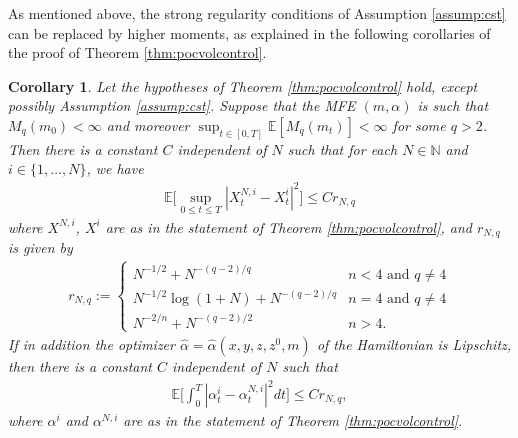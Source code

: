 \documentclass[11pt,reqno]{amsart}
\numberwithin{equation}{section}
\newtheorem{corollary}[theorem]{Corollary}
\theoremstyle{definition}
\def\E{{\mathbb E}}
\def\N{{\mathbb N}}
\def \E{\mathbb{E}}
\def \N{\mathbb{N}}
\begin{document}
As mentioned above, the strong regularity conditions of Assumption \ref{assump:cst} can be replaced by higher moments, as explained in the following corollaries of the proof of Theorem \ref{thm:pocvolcontrol}. 

\begin{corollary}
\label{cor:q.moment}
 Let the hypotheses of Theorem \ref{thm:pocvolcontrol} hold, except possibly Assumption \ref{assump:cst}. Suppose that the MFE $(m,\alpha)$ is such that $M_q(m_0) < \infty$ and moreover $\sup_{t\in [0,T]}\E[M_q(m_t)]<\infty$ for some $q>2$. Then there is a constant $C$ independent of $N$ such that for each $N \in \N$ and $i \in \{1,\dots,N\}$, we have
\begin{align*}
\E\Big[\sup_{0 \leq t \leq T} |X_t^{N,i} - X_t^i|^2\Big]\le  Cr_{N,q}
\end{align*}
where $X^{N,i}$, $X^i$ are as in the statement of Theorem \ref{thm:pocvolcontrol}, and $r_{N,q}$ is given by 
 \begin{align} \label{rnqdef}
  r_{N,q} := 
  \begin{cases}
    N^{-1/2} + N^{-(q-2)/q} & n < 4 \text{ and } q \neq 4 \\
    N^{-1/2} \log(1 + N) + N^{-(q-2)/q} & n = 4 \text{ and } q \neq 4 \\
    N^{-2/n} + N^{-(q-2)/2} & n > 4.
  \end{cases}
\end{align}
If in addition the optimizer $\widehat{\alpha} = \widehat{\alpha}(x,y,z,z^0,m)$ of the Hamiltonian is Lipschitz, then there is a constant $C$ independent of $N$ such that
\begin{align*}
\E\bigg[\int_0^T |\alpha_t^i - \alpha_t^{N,i}|^2 dt \bigg] \leq C r_{N,q},  
\end{align*}
where $\alpha^i$ and $\alpha^{N,i}$ are as in the statement of Theorem \ref{thm:pocvolcontrol}.
\end{corollary}
\end{document}
